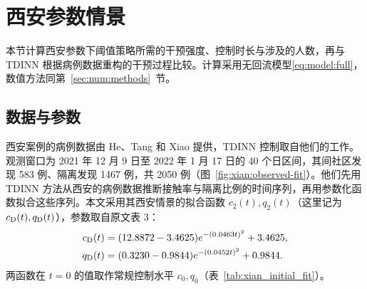 \section{西安参数情景}
\label{sec:xian}
本节计算西安参数下阈值策略所需的干预强度、控制时长与涉及的人数，再与 TDINN 根据病例数据重构的干预过程比较。计算采用无回流模型\eqref{eq:model:full}，数值方法同第~\ref{sec:num:methods}~节。

\subsection{数据与参数}
\label{sec:xian:data}
西安案例的病例数据由 He、Tang 和 Xiao 提供，TDINN 控制取自他们的工作\cite{He2023TDINN}。观测窗口为 2021 年 12 月 9 日至 2022 年 1 月 17 日的 40 个日区间，其间社区发现 583 例、隔离发现 1467 例，共 2050 例（图~\ref{fig:xian:observed-fit}）。他们先用 TDINN 方法从西安的病例数据推断接触率与隔离比例的时间序列，再用参数化函数拟合这些序列。本文采用其西安情景的拟合函数 $c_2(t),q_2(t)$（这里记为 $c_{\rm D}(t),q_{\rm D}(t)$），参数取自原文表 3：
\[
\begin{aligned}
c_{\rm D}(t)&=(12.8872-3.4625)e^{-(0.0463t)^2}+3.4625,\\
q_{\rm D}(t)&=(0.3230-0.9844)e^{-(0.0452t)^2}+0.9844.
\end{aligned}
\]
两函数在 $t=0$ 的值取作常规控制水平 $c_0,q_0$（表~\ref{tab:xian_initial_fit}）。
